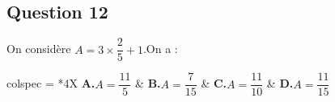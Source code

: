 \documentclass[10pt]{article}
\begin{document}
\subsection*{Question 12}
	On considère \quad $A=3 \times \dfrac{2}{5}+1$.\quad On a :

	\medskip
	\begin{tblr}{colspec = {*4{X}}}
		\textbf{A.}\quad $A=\dfrac{11}{5}$ &
		\textbf{B.}\quad $A=\dfrac{7}{15}$ &
		\textbf{C.}\quad $A=\dfrac{11}{10}$ &
		\textbf{D.}\quad $A=\dfrac{11}{15}$
	\end{tblr}


\end{document}
